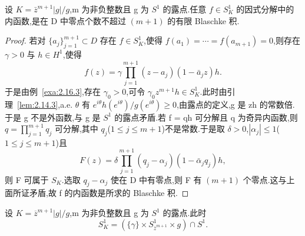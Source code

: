 \begin{lemma}\label{lem:2.16.5}
设 $K = \bar{z}^{m+1}|g|/g$,m 为非负整数且 g 为 $S^{1}$ 的露点.任意 $f \in S_{K}^{1}$ 的因式分解中的内函数,是在 D 中零点个数不超过 $(m+1)$ 的有限 Blaschke 积.
\end{lemma}

\begin{proof}
若对 $\{a_{j}\}_{j=1}^{m+1} \subset D$ 存在 $f \in S_{K}^{1}$,使得 $f(a_{1}) = \cdots = f(a_{m+1}) = 0$,则存在 $\gamma > 0$ 与 $h \in H^{1}$,使得
\begin{equation*}
f(z) = \gamma \prod_{j=1}^{m+1} (z - a_{j})(1 - \bar{a}_{j}z) h.
\end{equation*}
于是由例~\ref{exa:2.16.3},存在 $\gamma_{0} > 0$,可令 $\gamma_{0}z^{m+1}h \in S_{K}^{1}$.此时由引理~\ref{lem:2.14.3},a.e. $\theta$ 有 $e^{i\theta}h(e^{i\theta})/g(e^{i\theta}) \geq 0$,由露点的定义,g 是 zh 的常数倍.于是 g 不是外函数,与 g 是 $S^{1}$ 的露点矛盾.若 f = qh 可分解且 q 为奇异内函数,则 $q = \prod_{j=1}^{m+1} q_{j}$ 可分解,其中 $q_{j}$($1 \leq j \leq m+1$)不是常数.于是取 $\delta > 0$,$|\alpha_{j}| \leq 1$($1 \leq j \leq m+1$)且
\begin{equation*}
F(z) = \delta \prod_{j=1}^{m+1} (q_{j} - \alpha_{j})(1 - \bar{\alpha}_{j}q_{j}) h,
\end{equation*}
则 F 可属于 $S_{K}$.选取 $q_{j} - \alpha_{j}$ 使在 D 中有零点,则 F 有 $(m+1)$ 个零点.这与上面所证矛盾,故 f 的内函数是所求的 Blaschke 积.
\end{proof}

\begin{lemma}\label{lem:2.16.6}
设 $K = \overline{z}^{m+1}|g|/g$,m 为非负整数且 g 为 $S^{1}$ 的露点.此时
\begin{equation*}
S_{K}^{1} = (\{\gamma\} \times S_{\bar{z}^{m+1}}^{1} \times g) \cap S^{1}.
\end{equation*}
\end{lemma}

